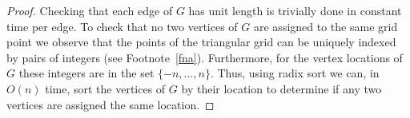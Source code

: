 \documentclass{article}
\begin{document}
{\begin{proof}
Checking that each edge of $G$ has unit length is trivially done in
constant time per edge.  To check that no two vertices of $G$ are
assigned to the same grid point we observe that the points of the
triangular grid can be uniquely indexed by pairs of integers (see
Footnote~\ref{fna}).  Furthermore, for the vertex locations of $G$ these
integers are in the set $\{-n,\ldots,n\}$.  Thus, using radix sort we
can, in $O(n)$ time, sort the vertices of $G$ by their location to
determine if any two vertices are assigned the same location.
\end{proof}
}
\end{document}
